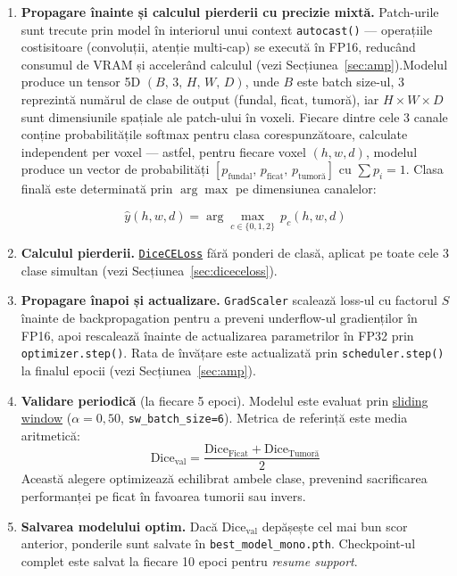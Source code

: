 \documentclass[12pt, a4paper]{report}
\begin{document}
\begin{enumerate}
    \item \textbf{Propagare înainte și calculul pierderii
    cu precizie mixtă.}
    Patch-urile sunt trecute prin model în interiorul unui
    context \texttt{autocast()} — operațiile costisitoare
    (convoluții, atenție multi-cap) se execută în FP16,
    reducând consumul de VRAM și accelerând calculul
    (vezi Secțiunea~\ref{sec:amp}).Modelul produce un tensor 5D $(B,\, 3,\, H,\, W,\, D)$, unde
$B$ este batch size-ul, $3$ reprezintă numărul de clase de output
(fundal, ficat, tumoră), iar $H \times W \times D$ sunt dimensiunile
spațiale ale patch-ului în voxeli. Fiecare dintre cele 3 canale
conține probabilitățile softmax pentru clasa corespunzătoare,
calculate independent per voxel — astfel, pentru fiecare voxel
$(h, w, d)$, modelul produce un vector de probabilități
$[p_{\text{fundal}},\, p_{\text{ficat}},\, p_{\text{tumoră}}]$
cu $\sum p_i = 1$. Clasa finală este determinată prin
$\arg\max$ pe dimensiunea canalelor:

\begin{equation}
    \hat{y}(h,w,d) = \arg\max_{c \in \{0,1,2\}}
    \, p_c(h,w,d)
\end{equation}


    \item \textbf{Calculul pierderii.}
    \hyperref[sec:diceceloss]{\texttt{DiceCELoss}} fără
    ponderi de clasă, aplicat pe toate cele 3 clase simultan
    (vezi Secțiunea~\ref{sec:diceceloss}).

    \item \textbf{Propagare înapoi și actualizare.}
    \texttt{GradScaler} scalează loss-ul cu factorul $S$
    înainte de backpropagation pentru a preveni underflow-ul
    gradienților în FP16, apoi rescalează înainte de
    actualizarea parametrilor în FP32 prin
    \texttt{optimizer.step()}. Rata de învățare este
    actualizată prin \texttt{scheduler.step()} la finalul
    epocii (vezi Secțiunea~\ref{sec:amp}).

    \item \textbf{Validare periodică} (la fiecare 5 epoci).
    Modelul este evaluat prin
    \hyperref[sec:overlap]{sliding window}
    ($\alpha = 0{,}50$, \texttt{sw\_batch\_size=6}).
    Metrica de referință este media aritmetică:
    \begin{equation}
        \text{Dice}_{\text{val}}
        = \frac{\text{Dice}_{\text{Ficat}}
              + \text{Dice}_{\text{Tumoră}}}{2}
    \end{equation}
    Această alegere optimizează echilibrat ambele clase,
    prevenind sacrificarea performanței pe ficat în favoarea
    tumorii sau invers.

    \item \textbf{Salvarea modelului optim.}
    Dacă $\text{Dice}_{\text{val}}$ depășește cel mai bun
    scor anterior, ponderile sunt salvate în
    \texttt{best\_model\_mono.pth}. Checkpoint-ul complet
    este salvat la fiecare 10 epoci pentru
    \textit{resume support}.
\end{enumerate}
\end{document}
